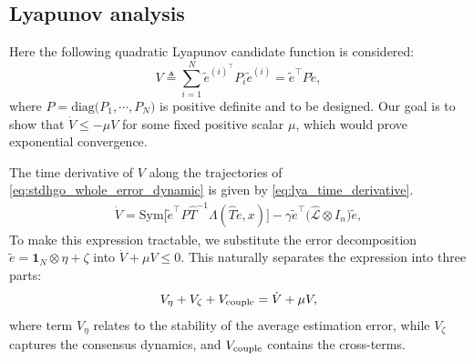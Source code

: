 \documentclass{ifacconf}
\begin{document}
\subsection{Lyapunov analysis}
\vspace*{-0.3 cm}

Here the following quadratic Lyapunov candidate function is considered:
\begin{equation}
    V\triangleq\sum_{i=1}^N \tilde{e}^{(i)^\top} {P_i} \tilde{e}^{(i)}=\tilde{e}^\top P\tilde{e},
    \label{eq:lya}
\end{equation}
where $P = \mathrm{diag}\big(P_1,\cdots,P_N\big)$ is positive definite and to be designed. Our goal is to show that $\dot{V}\le-\mu V$ for some fixed positive scalar $\mu$, which would prove exponential convergence.

The time derivative of $V$ along the trajectories of \eqref{eq:stdhgo_whole_error_dynamic} is given by \eqref{eq:lya_time_derivative}.
\begin{equation}
    \begin{aligned}
        \dot{V}=\mathrm{Sym}\Big[\tilde{e}^\top P\hat{T}^{-1}\Lambda(\hat{T}\tilde{e},x)\Big]-\gamma \tilde{e}^\top\big(\hat{\mathcal{L}}\otimes I_{n}\big)\tilde{e},
        \label{eq:lya_time_derivative}
    \end{aligned}
\end{equation}
To make this expression tractable, we substitute the error decomposition $\tilde{e}=\mathbf{1}_N\otimes\eta+\zeta$ into $\dot{V}+\mu V\le0$. This naturally separates the expression into three parts:
\begin{equation}
    \begin{aligned}
      V_\eta+V_\zeta+V_{\rm couple} = \dot{V}+\mu V,
    \end{aligned}\label{eq:asymptotic target decomposition}
\end{equation}
where term $V_\eta$ relates to the stability of the average estimation error, while $V_\zeta$ captures the consensus dynamics, and $V_{\rm couple}$ contains the cross-terms. 
\end{document}
